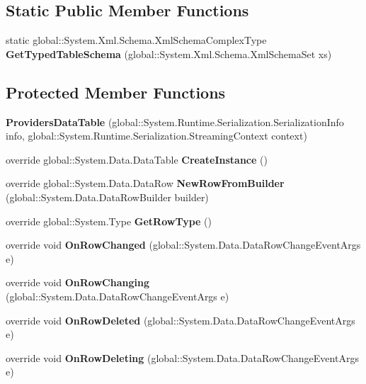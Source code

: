\subsection*{Static Public Member Functions}
\begin{DoxyCompactItemize}
\item 
\mbox{\label{class_a_f_h___scheduler_1_1_home_inspection_data_set_1_1_providers_data_table_a5e6047792dfbfd0505c27d7fdfac16d2}} 
static global\+::\+System.\+Xml.\+Schema.\+Xml\+Schema\+Complex\+Type {\bfseries Get\+Typed\+Table\+Schema} (global\+::\+System.\+Xml.\+Schema.\+Xml\+Schema\+Set xs)
\end{DoxyCompactItemize}
\subsection*{Protected Member Functions}
\begin{DoxyCompactItemize}
\item 
\mbox{\label{class_a_f_h___scheduler_1_1_home_inspection_data_set_1_1_providers_data_table_ace6ff7dc17a108c8799ce55b40c6f455}} 
{\bfseries Providers\+Data\+Table} (global\+::\+System.\+Runtime.\+Serialization.\+Serialization\+Info info, global\+::\+System.\+Runtime.\+Serialization.\+Streaming\+Context context)
\item 
\mbox{\label{class_a_f_h___scheduler_1_1_home_inspection_data_set_1_1_providers_data_table_a15a3b27cbe924a5dda741072426c4b44}} 
override global\+::\+System.\+Data.\+Data\+Table {\bfseries Create\+Instance} ()
\item 
\mbox{\label{class_a_f_h___scheduler_1_1_home_inspection_data_set_1_1_providers_data_table_a588429da5302851bef22495f179c588d}} 
override global\+::\+System.\+Data.\+Data\+Row {\bfseries New\+Row\+From\+Builder} (global\+::\+System.\+Data.\+Data\+Row\+Builder builder)
\item 
\mbox{\label{class_a_f_h___scheduler_1_1_home_inspection_data_set_1_1_providers_data_table_a34fe65a969e520fbbc4de74eabf5037d}} 
override global\+::\+System.\+Type {\bfseries Get\+Row\+Type} ()
\item 
\mbox{\label{class_a_f_h___scheduler_1_1_home_inspection_data_set_1_1_providers_data_table_ac3e76c9875977dcebdfb13a4637dbcb2}} 
override void {\bfseries On\+Row\+Changed} (global\+::\+System.\+Data.\+Data\+Row\+Change\+Event\+Args e)
\item 
\mbox{\label{class_a_f_h___scheduler_1_1_home_inspection_data_set_1_1_providers_data_table_a8bc69c64dad4ee0881adf291883d6710}} 
override void {\bfseries On\+Row\+Changing} (global\+::\+System.\+Data.\+Data\+Row\+Change\+Event\+Args e)
\item 
\mbox{\label{class_a_f_h___scheduler_1_1_home_inspection_data_set_1_1_providers_data_table_a39007a6149410677a61d8703cc1dbbe9}} 
override void {\bfseries On\+Row\+Deleted} (global\+::\+System.\+Data.\+Data\+Row\+Change\+Event\+Args e)
\item 
\mbox{\label{class_a_f_h___scheduler_1_1_home_inspection_data_set_1_1_providers_data_table_a2ef0f5946ede5c1320b4351e994a4ac2}} 
override void {\bfseries On\+Row\+Deleting} (global\+::\+System.\+Data.\+Data\+Row\+Change\+Event\+Args e)
\end{DoxyCompactItemize}
